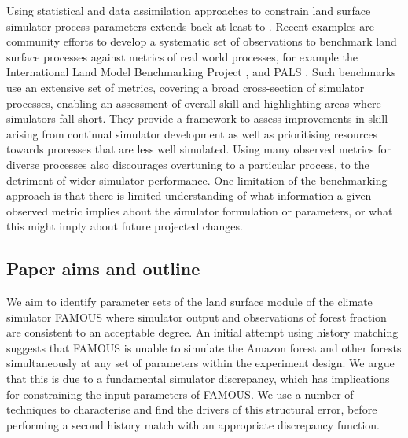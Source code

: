 \documentclass[esd, manuscript]{copernicus}
\begin{document}
Using statistical and data assimilation approaches to constrain land surface simulator process parameters extends back at least to \cite{sellers1996revised}. Recent examples are community efforts to develop a systematic set of observations to benchmark land surface processes against metrics of real world processes, for example the International Land Model Benchmarking Project \citep{luo2012framework}, and PALS \citep{abramowitz2012benchmarking}. Such benchmarks use an extensive set of metrics, covering a broad cross-section of simulator processes, enabling an assessment of overall skill and highlighting areas where simulators fall short. They provide a framework to assess improvements in skill arising from continual simulator development as well as prioritising resources towards processes that are less well simulated. Using many observed metrics for diverse processes also discourages overtuning to a particular process, to the detriment of wider simulator performance. One limitation of the benchmarking approach is that there is limited understanding of what information a given observed metric implies about the simulator formulation or parameters, or what this might imply about future projected changes.

\subsection{Paper aims and outline}

We aim to identify parameter sets of the land surface module of the climate simulator FAMOUS where simulator output and observations of forest fraction are consistent to an acceptable degree. An initial attempt using history matching suggests that FAMOUS is unable to simulate the Amazon forest and other forests simultaneously at any set of parameters within the experiment design. We argue that this is due to a fundamental simulator discrepancy, which has implications for constraining the input parameters of FAMOUS. We use a number of techniques to characterise and find the drivers of this structural error, before performing a second history match with an appropriate discrepancy function.
\end{document}
